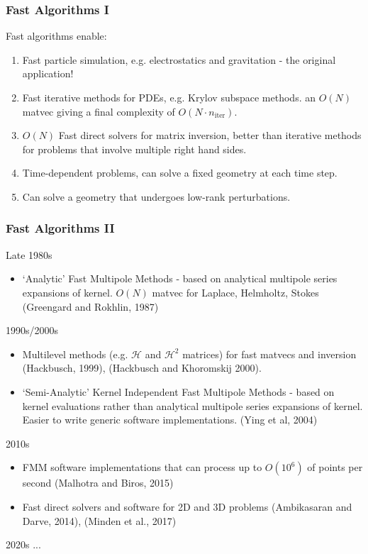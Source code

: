 \begin{frame}
    \frametitle{Fast Algorithms I}

    Fast algorithms enable:

    \begin{enumerate}
        \item Fast particle simulation, e.g. electrostatics and gravitation - the original application!
        \item Fast iterative methods for PDEs, e.g. Krylov subspace methods. an $O(N)$ matvec giving a final complexity of $O(N \cdot n_{\text{iter}})$.
        \item $O(N)$ Fast direct solvers for matrix inversion, better than iterative methods for problems that involve multiple right hand sides.
        \item Time-dependent problems, can solve a fixed geometry at each time step.
        \item Can solve a geometry that undergoes low-rank perturbations.
    \end{enumerate}

\end{frame}


\begin{frame}
    \frametitle{Fast Algorithms II}

    Late 1980s
    \begin{itemize}
        \item  `Analytic' Fast Multipole Methods - based on analytical multipole series expansions of kernel. $O(N)$ matvec for Laplace, Helmholtz, Stokes (Greengard and Rokhlin, 1987)
    \end{itemize}

    1990s/2000s
    \begin{itemize}
        \item  Multilevel methods (e.g. $\mathcal{H}$ and $\mathcal{H}^2$ matrices) for fast matvecs and inversion (Hackbusch, 1999), (Hackbusch and Khoromskij 2000).
        \item  `Semi-Analytic' Kernel Independent Fast Multipole Methods - based on kernel evaluations rather than analytical multipole series expansions of kernel. Easier to write generic software implementations. (Ying et al, 2004)
    \end{itemize}
    \end{frame}

    \begin{frame}

    2010s

    \begin{itemize}

        \item FMM software implementations that can process up to $O(10^6)$ of points per second (Malhotra and Biros, 2015)
        \item Fast direct solvers and software for 2D and 3D problems (Ambikasaran and Darve, 2014), (Minden et al., 2017)
    \end{itemize}

    2020s
    ...


\end{frame}


